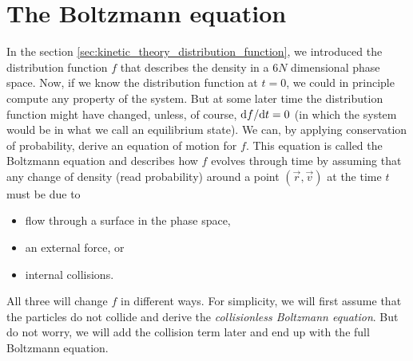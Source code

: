 \section{The Boltzmann equation}
\label{sec:boltzmann_equation}
In the section \ref{sec:kinetic_theory_distribution_function}, we introduced the distribution function $f$ that describes the density in a $6N$ dimensional phase space. Now, if we know the distribution function at $t=0$, we could in principle compute any property of the system. But at some later time the distribution function might have changed, unless, of course, $\mathrm{d}f/\mathrm{d}t = 0$ (in which the system would be in what we call an equilibrium state). We can, by applying conservation of probability, derive an equation of motion for $f$. This equation is called the Boltzmann equation and describes how $f$ evolves through time by assuming that any change of density (read probability) around a point $(\vec r, \vec v)$ at the time $t$ must be due to
\begin{itemize}
	\item flow through a surface in the phase space,
	\item an external force, or
	\item internal collisions.
\end{itemize}
All three will change $f$ in different ways. For simplicity, we will first assume that the particles do not collide and derive the \textit{collisionless Boltzmann equation}. But do not worry, we will add the collision term later and end up with the full Boltzmann equation.


